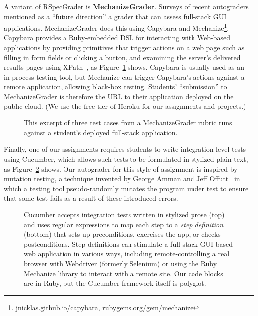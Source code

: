 A variant of RSpecGrader is \textbf{MechanizeGrader}.
Surveys of recent
autograders~\cite{ihantola-2010-autograding-survey,douce-2005-autograding-survey}
mentioned as a ``future direction'' a grader that can assess full-stack
GUI applications.
MechanizeGrader does this using Capybara and
Mechanize\footnote{\url{jnicklas.github.io/capybara},
\url{rubygems.org/gem/mechanize}}.
Capybara provides a Ruby-embedded DSL for interacting with Web-based
applications by providing primitives that trigger actions on a web page
such as filling in form fields or clicking a button, and examining the
server's delivered results pages using XPath~\cite{xpath}, as
Figure~\ref{fig:mechanize_grader_example} shows. 
Capybara is usually used as an in-process testing tool, but Mechanize
can trigger Capybara's actions against a remote application, allowing
black-box testing.
Students' ``submission'' to MechanizeGrader is therefore the URL to their
application deployed on the public 
cloud.  (We use the free tier of Heroku for our assignments and
projects.)

\begin{figure}
 \centering
  
  \caption{\label{fig:mechanize_grader_example} 
This excerpt of three test cases from a MechanizeGrader rubric runs
against a student's 
deployed full-stack application.}
\end{figure}

Finally, one of our assignments requires students to write integration-level
tests using Cucumber, which allows such tests to be formulated in
stylized plain text, as Figure~\ref{fig:cucumber} shows.
Our autograder for this
style of assignment is inspired by mutation testing, a technique invented
by George Amman and Jeff 
Offutt~\cite{ammann-offutt-sw-testing} in which a
testing tool pseudo-randomly mutates the program under test to ensure
that some test fails as a result of these introduced errors.

\begin{figure}
  \centering
    
  \caption{\label{fig:cucumber} Cucumber accepts integration tests 
    written in stylized prose (top) and uses regular expressions to map each
    step to a \emph{step definition} (bottom) that sets up preconditions, exercises the app,
    or checks postconditions.  Step definitions 
    can stimulate a full-stack GUI-based web application in various
    ways, including remote-controlling a real browser with Webdriver
    (formerly Selenium) or using the Ruby Mechanize library to interact
    with a remote site.  Our code blocks are in Ruby, but the Cucumber framework
itself is polyglot.} 
\end{figure}

